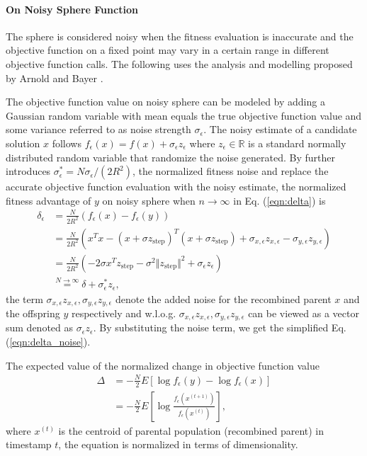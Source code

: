  \paragraph{On Noisy Sphere Function}
The sphere is considered noisy when the fitness evaluation is inaccurate and the objective function on a fixed point may vary in a certain range in different objective function calls. The following uses the analysis and modelling proposed by Arnold and Bayer \cite{ARNOLD2001127}. 

The objective function value on noisy sphere can be modeled by adding a Gaussian random variable with mean equals the true objective function value and some variance referred to as noise strength $\sigma_\epsilon$. The noisy estimate of a candidate solution $x$ follows $f_{\epsilon}(x) = f(x) + \sigma_{\epsilon}z_\epsilon$ where $z_\epsilon \in \mathbb{R}$ is a standard normally distributed random variable that randomize the noise generated. By further introduces $\sigma_\epsilon^* = N \sigma_\epsilon / (2R^2)$, the normalized fitness noise \cite{1284729} and replace the accurate objective function evaluation with the noisy estimate, the normalized fitness advantage of $y$ on noisy sphere when $n \rightarrow \infty$ in Eq. (\ref{eqn:delta}) is
\begin{align}
\delta_\epsilon &=  \frac{N}{2R^2}\left( f_\epsilon (x) - f_\epsilon(y)\right)  \nonumber\\ 
& = \frac{N}{2R^2} (x^Tx - (x+\sigma z_{\text{step}})^T (x+\sigma z_{\text{step}}) +\sigma_{x,\epsilon} z_{x,\epsilon}-\sigma_{y,\epsilon} z_{y,\epsilon}) \nonumber\\
& = \frac{N}{2R^2} (-2 \sigma x^Tz_{\text{step}} - \sigma^2 \Vert z_{\text{step}}\Vert^2 +\sigma_\epsilon z_\epsilon) \nonumber\\
&\overset{N \rightarrow \infty}{=} \delta+\sigma_\epsilon^* z_\epsilon, \label{eqn:delta_noise}{}
\end{align}
the term $\sigma_{x,\epsilon} z_{x,\epsilon},\sigma_{y,\epsilon} z_{y,\epsilon}$ denote the added noise for the recombined parent $x$ and the offspring $y$ respectively and w.l.o.g. $\sigma_{x,\epsilon} z_{x,\epsilon},\sigma_{y,\epsilon} z_{y,\epsilon}$ can be viewed as a vector sum denoted as $\sigma_\epsilon z_\epsilon$. By substituting the noise term, we get the simplified Eq. (\ref{eqn:delta_noise}).

The expected value of the normalized change in objective function value  
\begin{align}
\Delta &= -\frac{N}{2} E \left [  \log f_\epsilon(y) - \log {f_\epsilon(x)} \right ] \nonumber\\
 &= -\frac{N}{2} E \left [  \log \frac{f_\epsilon(x^{(t+1)})}{f_\epsilon(x^{(t)})} \right ], 
\end{align}
where $x^{(t)}$ is the centroid of parental population (recombined parent) in timestamp $t$, the equation is normalized in terms of dimensionality.

